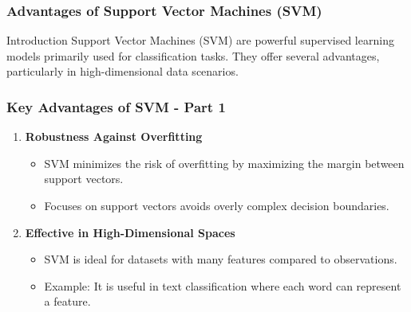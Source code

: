 \documentclass{beamer}
\begin{document}
\begin{frame}[fragile]
    \frametitle{Advantages of Support Vector Machines (SVM)}
    \begin{block}{Introduction}
        Support Vector Machines (SVM) are powerful supervised learning models primarily used for classification tasks. 
        They offer several advantages, particularly in high-dimensional data scenarios.
    \end{block}
\end{frame}

\begin{frame}[fragile]
    \frametitle{Key Advantages of SVM - Part 1}
    \begin{enumerate}
        \item \textbf{Robustness Against Overfitting}
        \begin{itemize}
            \item SVM minimizes the risk of overfitting by maximizing the margin between support vectors.
            \item Focuses on support vectors avoids overly complex decision boundaries.
        \end{itemize}
        
        \item \textbf{Effective in High-Dimensional Spaces}
        \begin{itemize}
            \item SVM is ideal for datasets with many features compared to observations.
            \item Example: It is useful in text classification where each word can represent a feature.
        \end{itemize}
    \end{enumerate}
\end{frame}
\end{document}
